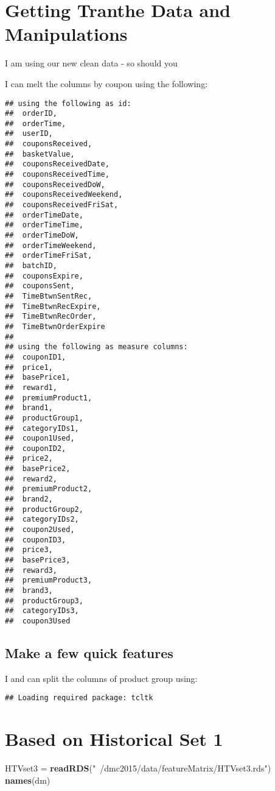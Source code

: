 \documentclass[10pt]{report}
\newenvironment{Shaded}{}{}
\newcommand{\KeywordTok}[1]{\textcolor[rgb]{0.00,0.44,0.13}{\textbf{{#1}}}}
\newcommand{\StringTok}[1]{\textcolor[rgb]{0.25,0.44,0.63}{{#1}}}
\newcommand{\NormalTok}[1]{{#1}}
\begin{document}
\section{Getting Tranthe Data and
Manipulations}\label{getting-tranthe-data-and-manipulations}

I am using our new clean data - so should you

I can melt the columns by coupon using the following:

\begin{verbatim}
## using the following as id:
##  orderID,
##  orderTime,
##  userID,
##  couponsReceived,
##  basketValue,
##  couponsReceivedDate,
##  couponsReceivedTime,
##  couponsReceivedDoW,
##  couponsReceivedWeekend,
##  couponsReceivedFriSat,
##  orderTimeDate,
##  orderTimeTime,
##  orderTimeDoW,
##  orderTimeWeekend,
##  orderTimeFriSat,
##  batchID,
##  couponsExpire,
##  couponsSent,
##  TimeBtwnSentRec,
##  TimeBtwnRecExpire,
##  TimeBtwnRecOrder,
##  TimeBtwnOrderExpire
## 
## using the following as measure columns:
##  couponID1,
##  price1,
##  basePrice1,
##  reward1,
##  premiumProduct1,
##  brand1,
##  productGroup1,
##  categoryIDs1,
##  coupon1Used,
##  couponID2,
##  price2,
##  basePrice2,
##  reward2,
##  premiumProduct2,
##  brand2,
##  productGroup2,
##  categoryIDs2,
##  coupon2Used,
##  couponID3,
##  price3,
##  basePrice3,
##  reward3,
##  premiumProduct3,
##  brand3,
##  productGroup3,
##  categoryIDs3,
##  coupon3Used
\end{verbatim}

\subsection{Make a few quick features}\label{make-a-few-quick-features}

I and can split the columns of product group using:

\begin{verbatim}
## Loading required package: tcltk
\end{verbatim}

\section{Based on Historical Set 1}\label{based-on-historical-set-1}

\begin{Shaded}
\begin{Highlighting}[]
\NormalTok{HTVset3 =}\StringTok{ }\KeywordTok{readRDS}\NormalTok{(}\StringTok{"~/dmc2015/data/featureMatrix/HTVset3.rds"}\NormalTok{)}
\KeywordTok{names}\NormalTok{(dm)}
\end{Highlighting}
\end{Shaded}
\end{document}
